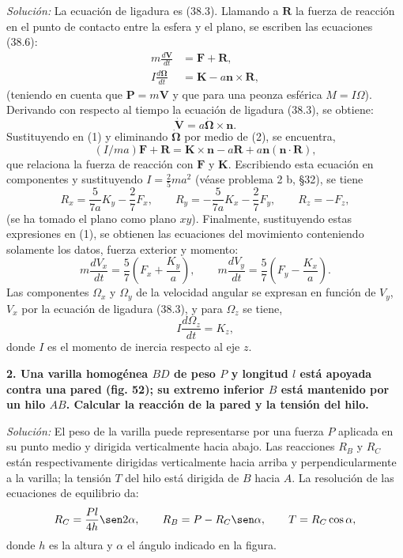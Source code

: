\documentclass[12pt]{article}
\begin{document}
\textit{Solución:} La ecuación de ligadura es (38.3). Llamando a $\mathbf{R}$ la fuerza de reacción en el punto de contacto entre la esfera y el plano, se escriben las ecuaciones (38.6):
\begin{align*}
m \frac{d\mathbf{V}}{dt} &= \mathbf{F} + \mathbf{R}, \tag{1} \\
I \frac{d\mathbf{\Omega}}{dt} &= \mathbf{K} - a \mathbf{n} \times \mathbf{R}, \tag{2}
\end{align*}
(teniendo en cuenta que $\mathbf{P} = m\mathbf{V}$ y que para una peonza esférica $M = I\Omega$). Derivando con respecto al tiempo la ecuación de ligadura (38.3), se obtiene:
\[
\dot{\mathbf{V}} = a \dot{\mathbf{\Omega}} \times \mathbf{n}.
\]
Sustituyendo en (1) y eliminando $\dot{\mathbf{\Omega}}$ por medio de (2), se encuentra,
\[
(I/ma)\mathbf{F} + \mathbf{R} = \mathbf{K} \times \mathbf{n} - a \mathbf{R} + a \mathbf{n}(\mathbf{n} \cdot \mathbf{R}),
\]
que relaciona la fuerza de reacción con $\mathbf{F}$ y $\mathbf{K}$. Escribiendo esta ecuación en componentes y sustituyendo $I = \frac{2}{5}ma^2$ (véase problema 2 b, §32), se tiene
\[
R_{x} = \frac{5}{7a}K_y - \frac{2}{7}F_x, \qquad R_{y} = -\frac{5}{7a}K_x - \frac{2}{7}F_y, \qquad R_z = -F_z,
\]
(se ha tomado el plano como plano $xy$). Finalmente, sustituyendo estas expresiones en (1), se obtienen las ecuaciones del movimiento conteniendo solamente los datos, fuerza exterior y momento:
\[
m \frac{dV_x}{dt} = \frac{5}{7} \left( F_x + \frac{K_y}{a} \right), \qquad m \frac{dV_y}{dt} = \frac{5}{7} \left( F_y - \frac{K_x}{a} \right).
\]
Las componentes $\Omega_x$ y $\Omega_y$ de la velocidad angular se expresan en función de $V_y$, $V_x$ por la ecuación de ligadura (38.3), y para $\Omega_z$ se tiene,
\[
I \frac{d\Omega_z}{dt} = K_z,
\]
donde $I$ es el momento de inercia respecto al eje $z$.


\textbf{2. Una varilla homogénea $BD$ de peso $P$ y longitud $l$ está apoyada contra una pared (fig. 52); su extremo inferior $B$ está mantenido por un hilo $AB$. Calcular la reacción de la pared y la tensión del hilo.}

\textit{Solución:} El peso de la varilla puede representarse por una fuerza $P$ aplicada en su punto medio y dirigida verticalmente hacia abajo. Las reacciones $R_B$ y $R_C$ están respectivamente dirigidas verticalmente hacia arriba y perpendicularmente a la varilla; la tensión $T$ del hilo está dirigida de $B$ hacia $A$. La resolución de las ecuaciones de equilibrio da:
\[
R_C = \frac{Pl}{4h} \sen 2\alpha, \qquad R_B = P - R_C \sen \alpha, \qquad T = R_C \cos \alpha,
\]
donde $h$ es la altura y $\alpha$ el ángulo indicado en la figura.
\end{document}
